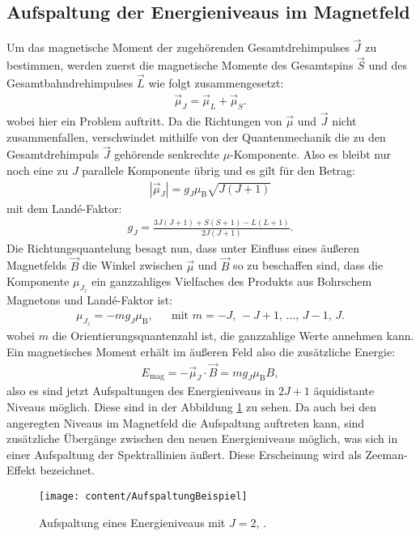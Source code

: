 \subsection{Aufspaltung der Energieniveaus im Magnetfeld}
Um das magnetische Moment der zugehörenden Gesamtdrehimpulses $\vec{J}$ zu bestimmen, werden zuerst die magnetische Momente des Gesamtspins $\vec{S} $ und des Gesamtbahndrehimpulses $\vec{L}$ wie folgt zusammengesetzt:
\begin{align}
\vec{\mu}_J=\vec{\mu}_L+\vec{\mu}_S.
\end{align} 
wobei hier ein Problem auftritt. Da die Richtungen von $\vec{\mu}$ und $\vec{J}$ nicht zusammenfallen, verschwindet mithilfe von der Quantenmechanik die zu den Gesamtdrehimpuls $\vec{J}$ gehörende senkrechte $\mu$-Komponente. Also es bleibt nur noch eine zu $J$ parallele Komponente übrig und es gilt für den Betrag:
\begin{align}
|\vec{\mu}_J|=g_J\mu_\text{B}\sqrt{J(J+1)}
\end{align}
mit dem Landé-Faktor:
\begin{align}
g_J=\frac{3J(J+1)+S(S+1)-L(L+1)}{2J(J+1)}. \label{eqn:lande}
\end{align}
Die Richtungsquantelung besagt nun, dass unter Einfluss eines äußeren Magnetfelds $\vec{B}$ die Winkel zwischen $\vec{\mu}$ und $\vec{B}$ so zu beschaffen sind, dass die Komponente $\mu_{J_z}$ ein ganzzahliges Vielfaches des Produkts aus Bohrschem Magnetons und Landé-Faktor ist:
\begin{align}
\mu_{J_z}=-mg_J\mu_\text{B}, &&\text{mit } m=-J,\,-J+1,\,...,\,J-1,\,J.
\end{align}
wobei $m$ die Orientierungsquantenzahl ist, die ganzzahlige Werte annehmen kann. Ein magnetisches Moment erhält im äußeren Feld also die zusätzliche Energie: 
\begin{align}
E_\text{mag}=-\vec{\mu}_J\cdot\vec{B}=mg_J\mu_\text{B}B,
\label{eqn:emag}
\end{align}
also es sind jetzt Aufspaltungen des Energieniveaus in $2J+1$ äquidistante Niveaus möglich. Diese sind in der Abbildung \ref{fig:aufspaltungbeispiel} zu sehen. Da auch bei den angeregten Niveaus im Magnetfeld die Aufspaltung auftreten kann, sind zusätzliche Übergänge zwischen den neuen Energieniveaus möglich, was sich in einer Aufspaltung der Spektrallinien äußert. Diese Erscheinung wird als Zeeman-Effekt bezeichnet.
\begin{figure}[h!]
	\centering
	\texttt{[image: content/AufspaltungBeispiel]}
	\caption{Aufspaltung eines Energieniveaus mit $J = 2$, \cite[5]{anleitungV27}.}
	\label{fig:aufspaltungbeispiel}
\end{figure}


